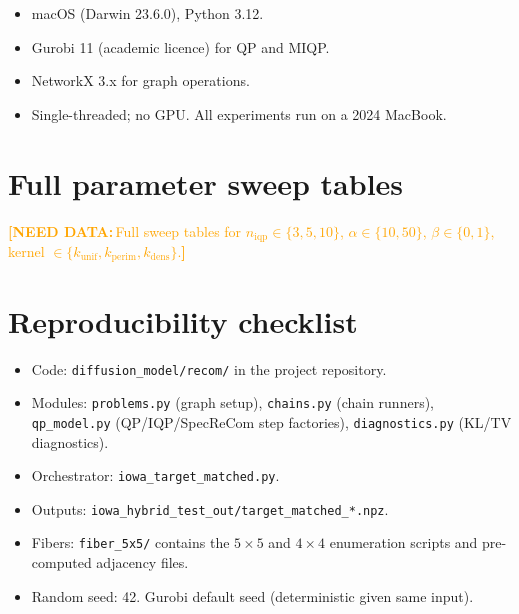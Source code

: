 \documentclass[11pt]{article}
\newcommand{\needdata}[1]{\textcolor{orange}{\textbf{[NEED DATA:}\,#1\textbf{]}}}
\begin{document}
\begin{itemize}
  \item macOS (Darwin 23.6.0), Python 3.12.
  \item Gurobi 11 (academic licence) for QP and MIQP.
  \item NetworkX 3.x for graph operations.
  \item Single-threaded; no GPU. All experiments run on a 2024
    MacBook.
\end{itemize}

\section{Full parameter sweep tables}\label{app:sweeps}

\needdata{Full sweep tables for $n_{\mathrm{iqp}} \in \{3, 5, 10\}$,
$\alpha \in \{10, 50\}$, $\beta \in \{0, 1\}$, kernel $\in \{k_{\mathrm{unif}},
k_{\mathrm{perim}}, k_{\mathrm{dens}}\}$.}

\section{Reproducibility checklist}\label{app:reproducibility}

\begin{itemize}
  \item Code: \texttt{diffusion\_model/recom/} in the project
    repository.
  \item Modules: \texttt{problems.py} (graph setup),
    \texttt{chains.py} (chain runners), \texttt{qp\_model.py}
    (QP/IQP/SpecReCom step factories), \texttt{diagnostics.py}
    (KL/TV diagnostics).
  \item Orchestrator: \texttt{iowa\_target\_matched.py}.
  \item Outputs: \texttt{iowa\_hybrid\_test\_out/target\_matched\_*.npz}.
  \item Fibers: \texttt{fiber\_5x5/} contains the $5 \times 5$ and
    $4 \times 4$ enumeration scripts and pre-computed
    adjacency files.
  \item Random seed: 42. Gurobi default seed (deterministic given
    same input).
\end{itemize}



\end{document}

